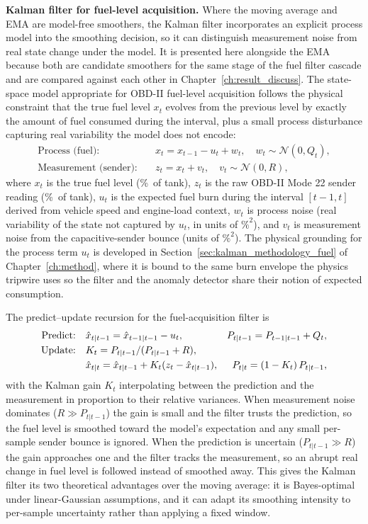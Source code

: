 \textbf{Kalman filter for fuel-level acquisition.} Where the moving average and EMA are model-free smoothers, the Kalman filter \cite{kalman1960new} incorporates an explicit process model into the smoothing decision, so it can distinguish measurement noise from real state change under the model. It is presented here alongside the EMA because both are candidate smoothers for the same stage of the fuel filter cascade and are compared against each other in Chapter~\ref{ch:result_discuss}. The state-space model appropriate for OBD-II fuel-level acquisition follows the physical constraint that the true fuel level $x_t$ evolves from the previous level by exactly the amount of fuel consumed during the interval, plus a small process disturbance capturing real variability the model does not encode:
\begin{align}
\text{Process (fuel):}    \quad & x_t     = x_{t-1} - u_t + w_t, \quad w_t \sim \mathcal{N}(0, Q_t), \label{eq:kf-process-fuel}\\
\text{Measurement (sender):} \quad & z_t     = x_t + v_t,          \quad v_t \sim \mathcal{N}(0, R),   \label{eq:kf-meas-fuel}
\end{align}
where $x_t$ is the true fuel level (\%~of tank), $z_t$ is the raw OBD-II Mode 22 sender reading (\%~of tank), $u_t$ is the expected fuel burn during the interval $[t-1, t]$ derived from vehicle speed and engine-load context, $w_t$ is process noise (real variability of the state not captured by $u_t$, in units of $\%^{2}$), and $v_t$ is measurement noise from the capacitive-sender bounce (units of $\%^{2}$). The physical grounding for the process term $u_t$ is developed in Section~\ref{sec:kalman_methodology_fuel} of Chapter~\ref{ch:method}, where it is bound to the same burn envelope the physics tripwire uses so the filter and the anomaly detector share their notion of expected consumption.

The predict--update recursion for the fuel-acquisition filter is
\begin{align}
\text{Predict:} \quad & \hat{x}_{t|t-1} = \hat{x}_{t-1|t-1} - u_t, & P_{t|t-1} = P_{t-1|t-1} + Q_t, \label{eq:kf-predict}\\
\text{Update:}  \quad & K_t = P_{t|t-1} / (P_{t|t-1} + R),        & \notag \\
                      & \hat{x}_{t|t}   = \hat{x}_{t|t-1} + K_t (z_t - \hat{x}_{t|t-1}), & P_{t|t}   = (1 - K_t)\, P_{t|t-1},  \label{eq:kf-update}
\end{align}
with the Kalman gain $K_t$ interpolating between the prediction and the measurement in proportion to their relative variances. When measurement noise dominates ($R \gg P_{t|t-1}$) the gain is small and the filter trusts the prediction, so the fuel level is smoothed toward the model's expectation and any small per-sample sender bounce is ignored. When the prediction is uncertain ($P_{t|t-1} \gg R$) the gain approaches one and the filter tracks the measurement, so an abrupt real change in fuel level is followed instead of smoothed away. This gives the Kalman filter its two theoretical advantages over the moving average: it is Bayes-optimal under linear-Gaussian assumptions, and it can adapt its smoothing intensity to per-sample uncertainty rather than applying a fixed window.

